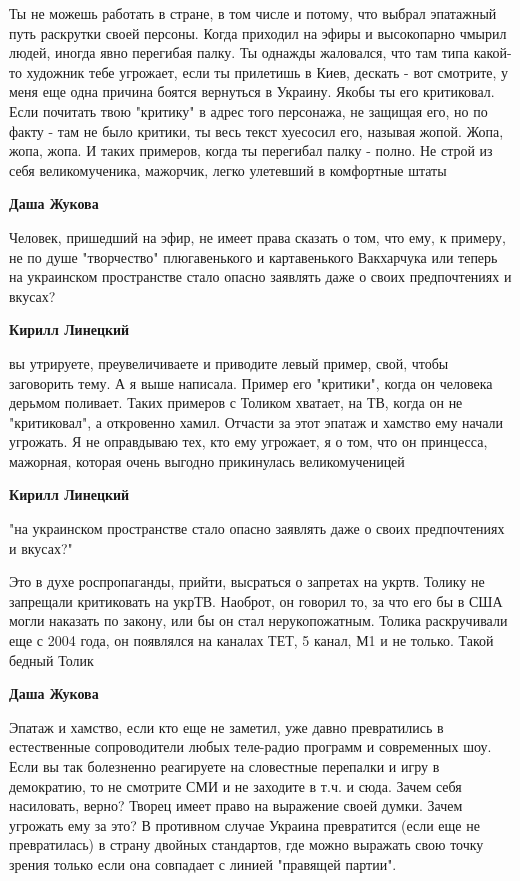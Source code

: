 \begin{itemize}
Ты не можешь работать в стране, в том числе и потому, что выбрал эпатажный путь
раскрутки своей персоны. Когда приходил на эфиры и высокопарно чмырил людей,
иногда явно перегибая палку. Ты однажды жаловался, что там типа какой-то
художник тебе угрожает, если ты прилетишь в Киев, дескать - вот смотрите, у
меня еще одна причина боятся вернуться в Украину. Якобы ты его критиковал. Если
почитать твою "критику" в адрес того персонажа, не защищая его, но по факту -
там не было критики, ты весь текст хуесосил его, называя жопой. Жопа, жопа,
жопа. И таких примеров, когда ты перегибал палку - полно. Не строй из себя
великомученика, мажорчик, легко улетевший в комфортные штаты

\begin{itemize} %
\textbf{Даша Жукова} 

Человек, пришедший на эфир, не имеет права сказать о том, что ему, к примеру,
не по душе "творчество" плюгавенького и картавенького Вакхарчука или теперь на
украинском пространстве стало опасно заявлять даже о своих предпочтениях и
вкусах?


\textbf{Кирилл Линецкий} 

вы утрируете, преувеличиваете и приводите левый пример, свой, чтобы заговорить
тему. А я выше написала. Пример его "критики", когда он человека дерьмом
поливает. Таких примеров с Толиком хватает, на ТВ, когда он не "критиковал", а
откровенно хамил. Отчасти за этот эпатаж и хамство ему начали угрожать. Я не
оправдываю тех, кто ему угрожает, я о том, что он принцесса, мажорная, которая
очень выгодно прикинулась великомученицей

\textbf{Кирилл Линецкий} 

"на украинском пространстве стало опасно заявлять даже о своих предпочтениях и вкусах?"

Это в духе роспропаганды, прийти, высраться о запретах на укртв. Толику не
запрещали критиковать на укрТВ. Наоброт, он говорил то, за что его бы в США
могли наказать по закону, или бы он стал нерукопожатным. Толика раскручивали
еще с 2004 года, он появлялся на каналах ТЕТ, 5 канал, М1 и не только. Такой
бедный Толик

\textbf{Даша Жукова} 

Эпатаж и хамство, если кто еще не заметил, уже давно превратились в
естественные сопроводители любых теле-радио программ и современных шоу. Если вы
так болезненно реагируете на словестные перепалки и игру в демократию, то не
смотрите СМИ и не заходите в т.ч. и сюда. Зачем себя насиловать, верно? Творец
имеет право на выражение своей думки. Зачем угрожать ему за это? В противном
случае Украина превратится (если еще не превратилась) в страну двойных
стандартов, где можно выражать свою точку зрения только если она совпадает с
линией "правящей партии".


\end{itemize}
\end{itemize}
